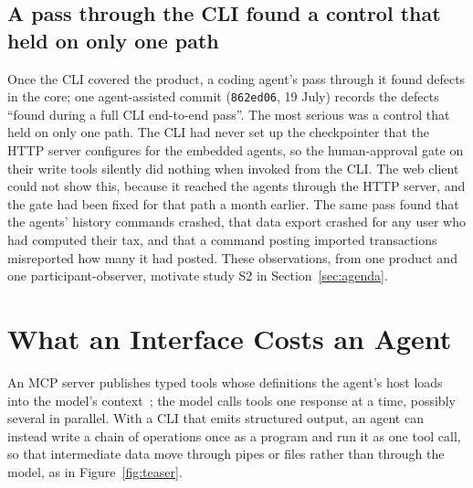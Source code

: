 \documentclass[sigconf,nonacm]{acmart}
\begin{document}
\subsection{A pass through the CLI found a control that held on only one path}
Once the CLI covered the product, a coding agent's pass through it found defects in the core; one agent-assisted commit (\texttt{862ed06}, 19 July) records the defects ``found during a full CLI end-to-end pass''. The most serious was a control that held on only one path. The CLI had never set up the checkpointer that the HTTP server configures for the embedded agents, so the human-approval gate on their write tools silently did nothing when invoked from the CLI. The web client could not show this, because it reached the agents through the HTTP server, and the gate had been fixed for that path a month earlier. The same pass found that the agents' history commands crashed, that data export crashed for any user who had computed their tax, and that a command posting imported transactions misreported how many it had posted. These observations, from one product and one participant-observer, motivate study S2 in Section~\ref{sec:agenda}.

\section{What an Interface Costs an Agent}
\label{sec:mcp}

An MCP server publishes typed tools whose definitions the agent's host loads into the model's context~\cite{mcp2024spec}; the model calls tools one response at a time, possibly several in parallel. With a CLI that emits structured output, an agent can instead write a chain of operations once as a program and run it as one tool call, so that intermediate data move through pipes or files rather than through the model, as in Figure~\ref{fig:teaser}.
\end{document}
